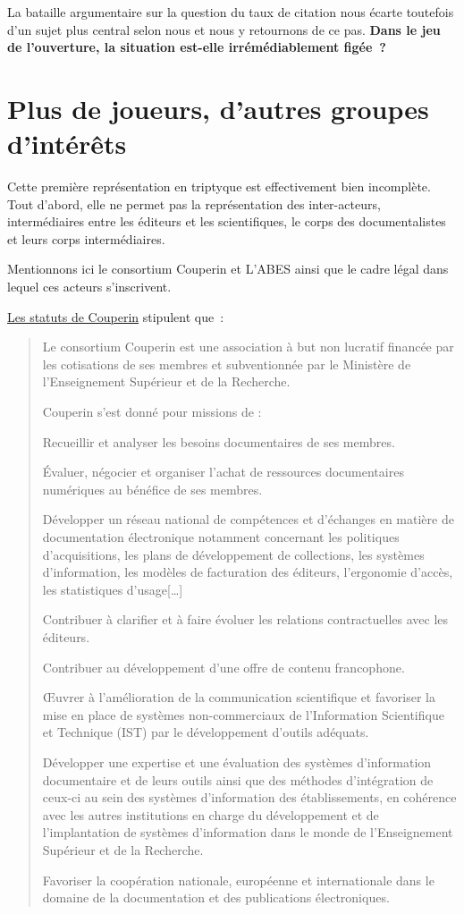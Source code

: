 La bataille argumentaire sur la question du taux de citation nous écarte toutefois d'un sujet plus central selon nous et nous y retournons de ce pas.
\textbf{Dans le jeu de l'ouverture, la situation est-elle irrémédiablement figée~?}

\section{Plus de joueurs, d'autres groupes d'intérêts}
Cette première représentation en triptyque est effectivement bien incomplète.
Tout d'abord, elle ne permet pas la représentation des inter-acteurs, intermédiaires entre les éditeurs et les scientifiques, le corps des documentalistes et leurs corps intermédiaires.

Mentionnons ici le consortium Couperin et L'ABES ainsi que le cadre légal dans lequel ces acteurs s'inscrivent.

\href{http://www.couperin.org/presentation}{Les statuts de Couperin} stipulent que~:
\blockcquote{couperin_mission_????}
{Le consortium Couperin est une association à but non lucratif financée par les cotisations de ses membres et subventionnée par le Ministère de l’Enseignement Supérieur et de la Recherche.

Couperin s'est donné pour missions de :
\begin{description}
 \item Recueillir et analyser les besoins documentaires de ses membres.
 \item Évaluer, négocier et organiser l'achat de ressources documentaires numériques au bénéfice de ses membres.
 \item Développer un réseau national de compétences et d'échanges en matière de documentation électronique notamment concernant les politiques d'acquisitions, les plans de développement de collections, les systèmes d'information, les modèles de facturation des éditeurs, l'ergonomie d'accès, les statistiques d'usage[\ldots]
 \item Contribuer à clarifier et à faire évoluer les relations contractuelles avec les éditeurs.
 \item Contribuer au développement d'une offre de contenu francophone.
 \item Œuvrer à l'amélioration de la communication scientifique et favoriser la mise en place de systèmes non-commerciaux de l'Information Scientifique et Technique (IST) par le développement d'outils adéquats.
 \item Développer une expertise et une évaluation des systèmes d'information documentaire et de leurs outils ainsi que des méthodes d'intégration de ceux-ci au sein des systèmes d'information des établissements, en cohérence avec les autres institutions en charge du développement et de l'implantation de systèmes d'information dans le monde de l'Enseignement Supérieur et de la Recherche.
 \item Favoriser la coopération nationale, européenne et internationale dans le domaine de la documentation et des publications électroniques.
\end{description}
}

